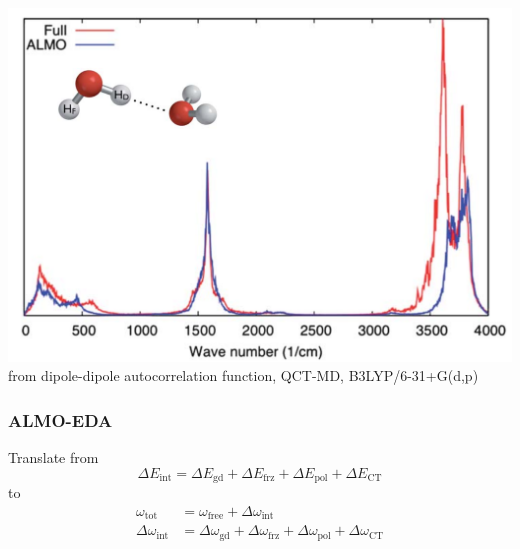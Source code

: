 \documentclass[xcolor=usenames,dvipsnames,svgnames]{beamer}
\begin{document}
\begin{frame}
  \centering
  \includegraphics[width=\linewidth,keepaspectratio]{./figures/almo_water_combined.pdf}
  {\tiny from dipole-dipole autocorrelation function, QCT-MD, B3LYP/6-31+G(d,p)}
\end{frame}

\begin{frame}
  \frametitle{ALMO-EDA}
  Translate from
  \begin{equation*}
    \Delta E_{\text{int}} = \Delta E_{\text{gd}} + \Delta E_{\text{frz}} + \Delta E_{\text{pol}} + \Delta E_{\text{CT}}
  \end{equation*}
  to
  \begin{equation*}
    \begin{aligned}
      \omega_{\text{tot}} &= \omega_{\text{free}} + \Delta \omega_{\text{int}} \\
      \Delta \omega_{\text{int}} &= \Delta \omega_{\text{gd}} + \Delta \omega_{\text{frz}} + \Delta \omega_{\text{pol}} + \Delta \omega_{\text{CT}}
    \end{aligned}
  \end{equation*}
\end{frame}
\end{document}

